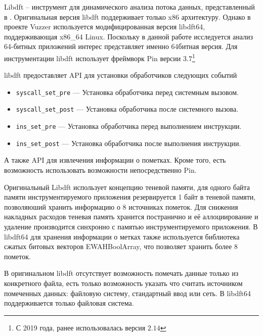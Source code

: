Libdft -- инструмент для динамического анализа потока данных, представленный в \cite{libdft}. Оригинальная версия libdft поддерживает только x86 архитектуру. Однако в проекте Vuzzer \cite{vuzzer} используется модифицированная версия libdft64, поддерживающая x86\_64 Linux. Поскольку в данной работе исследуется анализ 64-битных приложений интерес представляет именно 64битная версия.
Для инструментации libdft использует фреймворк Pin версии $3.7$\footnote{С 2019 года, ранее использовалась версия $2.14$}



libdft предоставляет API для установки обработчиков следующих событий
\begin{itemize}
    \item \texttt{syscall\_set\_pre} --- Установка обработчика перед системным вызовом.
    \item \texttt{syscall\_set\_post} --- Установка обработчика после системного вызова.
    \item \texttt{ins\_set\_pre} --- Установка обработчика перед выполнением инструкции.
    \item \texttt{ins\_set\_post} --- Установка обработчика после выполнения инструкции.
\end{itemize}
А также API для извлечения информации о пометках. Кроме того, есть возможность использовать возможности непосредственно Pin.

Оригинальный Libdft использует концепцию теневой памяти, для одного байта памяти инструментируемого приложения резервируется 1 байт в теневой памяти, позволяюший хранить информацию о 8 источниках пометок. Для снижения накладных расходов теневая память хранится постранично и её аллоциирование и удаление производится синхронно с памятью инструментируемого приложения.
В libdft64 для хранения информации о метках также используется библиотека сжатых битовых векторов EWAHBoolArray, что позволяет хранить более 8 пометок.

В оригинальном libdft отсутствует возможность помечать данные только из конкретного файла, есть только возможность указать что считать источником помеченных данных: файловую систему, стандартный ввод или сеть.
В libdft64 поддерживается только файловая система.

